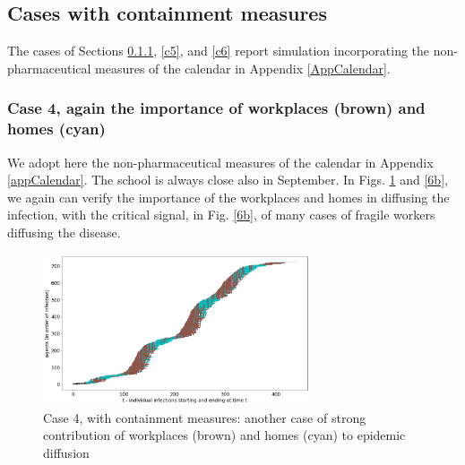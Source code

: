 \documentclass[graybox]{svmult}
\begin{document}
\subsection{Cases with containment measures}

The cases of Sections \ref{c4}, \ref{c5}, and \ref {c6} report simulation incorporating the non-pharmaceutical measures of the calendar in Appendix \ref{AppCalendar}.

\subsubsection{Case 4, again the importance of workplaces (brown) and homes (cyan)}
\label{c4}

We adopt here the non-pharmaceutical measures of the calendar in Appendix \ref{appCalendar}. The school is always close also in September. 
In Figs. \ref{6a} and \ref{6b}, we again can verify the importance of the workplaces and homes in diffusing the infection, with the critical signal, in Fig. \ref{6b}, of many cases of fragile workers diffusing the disease.

\begin{figure}[t]
\begin{center}
\includegraphics[width=0.7\textwidth]{with6a.png}%
\caption{Case 4, with containment measures: another case of strong contribution of workplaces (brown) and homes (cyan) to epidemic diffusion}
\label{6a}
\end{center}
\end{figure}
\end{document}
